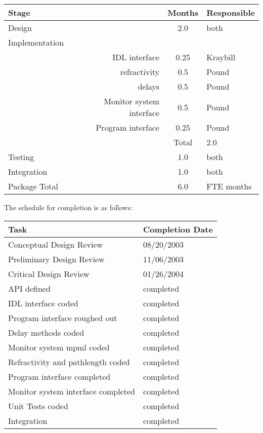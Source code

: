 \documentclass[preprint]{aastex}
\begin{document}
\begin{tabular}{lrcl}
\hline
Stage & & Months & Responsible \\
\hline
Design  & & 2.0 & both\\
Implementation& & & \\
  & IDL interface & 0.25 & Kraybill \\
  & refractivity  & 0.5 & Pound \\
  & delays        & 0.5 & Pound \\
  & Monitor system interface & 0.5 & Pound \\
  & Program interface & 0.25 & Pound \\
  &       \cline{1-2}
  & Total             & 2.0  & \\
Testing & & 1.0 & both\\
Integration & &  1.0 & both\\
\hline
Package Total & & 6.0 & FTE months  \\
\end{tabular}

\clearpage
The schedule for completion is as follows:

\begin{tabular}{ll}
\hline
Task & Completion Date\\
\hline
Conceptual Design Review  & 08/20/2003\\
Preliminary Design Review & 11/06/2003\\
Critical Design Review    & 01/26/2004\\
API defined                          & completed \\
IDL interface coded                  & completed \\
Program interface roughed out        & completed \\
Delay methods coded                  & completed \\
Monitor system mpml coded            & completed \\
Refractivity and pathlength coded    & completed\\
Program interface completed          & completed \\
Monitor system interface completed   & completed \\
Unit Tests coded                     & completed \\
Integration                          & completed \\
\end{tabular}
\end{document}
